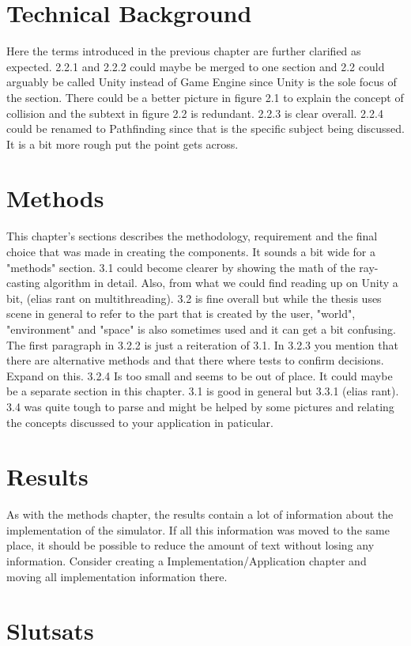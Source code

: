 \documentclass[12pt,a4paper,twoside,openright]{report}
\begin{document}
\section*{Technical Background}

	Here the terms introduced in the previous chapter are further clarified as
	expected. 2.2.1 and 2.2.2 could maybe be merged to one section and 2.2
	could arguably be called Unity instead of Game Engine since Unity is the
	sole focus of the section. There could be a better picture in figure 2.1 to
	explain the concept of collision and the subtext in figure 2.2 is
	redundant. 2.2.3 is clear overall. 2.2.4 could be renamed to Pathfinding
	since that is the specific subject being discussed. It is a bit more rough
	put the point gets across.

\section*{Methods}

	This chapter's sections describes the methodology, requirement and the
	final choice that was made in creating the components. It sounds a bit wide
	for a "methods" section. 3.1 could become clearer by showing the math of
	the ray-casting algorithm in detail. Also, from what we could find reading
	up on Unity a bit, (elias rant on multithreading). 3.2 is fine overall but
	while the thesis uses scene in general to refer to the part that is created
	by the user, "world", "environment" and "space" is also sometimes used and
	it can get a bit confusing. The first paragraph in 3.2.2 is just a
	reiteration of 3.1. In 3.2.3 you mention that there are alternative methods
	and that there where tests to confirm decisions. Expand on this. 3.2.4 Is
	too small and seems to be out of place. It could maybe be a separate
	section in this chapter. 3.1 is good in general but 3.3.1 (elias rant). 3.4
	was quite tough to parse and might be helped by some pictures and relating
	the concepts discussed to your application in paticular.

\section*{Results}

	As with the methods chapter, the results contain a lot of information about
	the implementation of the simulator. If all this information was moved to
	the same place, it should be possible to reduce the amount of text without
	losing any information. Consider creating a Implementation/Application 
	chapter and moving all implementation information there.

\section*{Slutsats}
\end{document}
